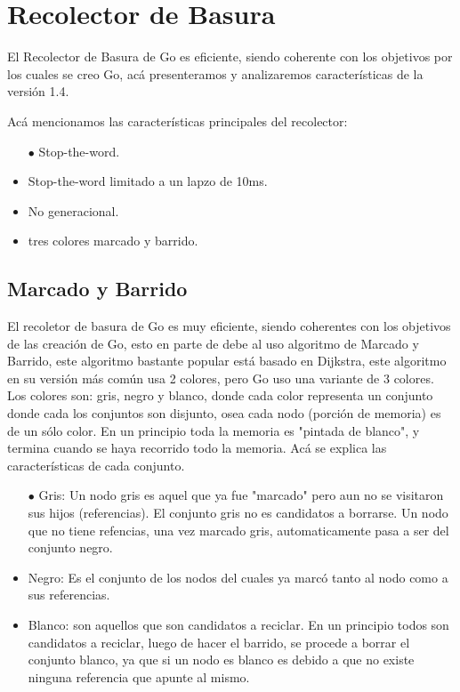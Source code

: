 \documentclass{article}
\begin{document}
\section{Recolector de Basura}
El Recolector de Basura de Go es eficiente, siendo coherente con los objetivos por los cuales se creo Go, acá presenteramos y analizaremos características de la versión 1.4. 

Acá mencionamos las características principales del recolector:

\begin{itemize}
\item [$\bullet$]Stop-the-word.
\item Stop-the-word limitado a un lapzo de 10ms.
\item No generacional.
\item tres colores marcado y barrido.

\end{itemize}
\subsection{Marcado y Barrido}

El recoletor de basura de Go es muy eficiente, siendo coherentes con los objetivos de las creación de Go, esto en parte de debe al uso algoritmo de Marcado y Barrido, este algoritmo bastante popular está basado en Dijkstra, este algoritmo en su versión más común usa 2 colores, pero Go uso una variante de 3 colores. Los colores son: gris, negro y blanco, donde cada color representa un conjunto donde cada los conjuntos son disjunto, osea cada nodo (porción de memoria) es de un sólo color. En un principio toda la memoria es "pintada de blanco", y termina cuando se haya recorrido todo la memoria. 
Acá se explica las características de cada conjunto.
\begin{itemize}
	\item[$\bullet$] Gris: Un nodo gris es aquel que ya fue "marcado" pero aun no se visitaron sus hijos (referencias). El conjunto gris no es candidatos a borrarse. Un nodo que no tiene refencias, una vez marcado gris, automaticamente pasa a ser del conjunto negro. 
	\item Negro: Es el conjunto de los nodos del cuales ya marcó tanto al nodo como a sus referencias.
	\item Blanco: son aquellos que son candidatos a reciclar. En un principio todos son candidatos a reciclar, luego de hacer el barrido, se procede a borrar el conjunto blanco, ya que si un nodo es blanco es debido a que no existe ninguna referencia que apunte al mismo. 
\end{itemize}
\end{document}
